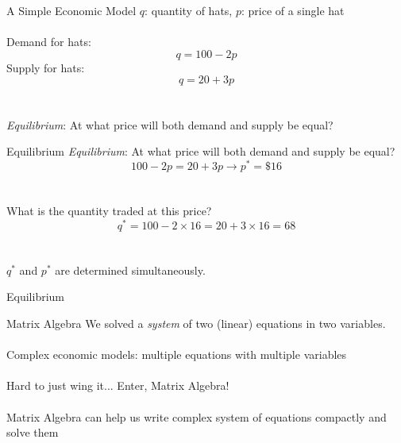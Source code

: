 \documentclass{./../../Latex/teaching_slides}
\begin{document}
\begin{frame}{A Simple Economic Model}
$ q $: quantity of hats, $p$: price of a single hat \\~\\
Demand for hats:
$$ q = 100-2p $$
Supply for hats:
$$ q = 20+3p $$ \\~\\
\textit{Equilibrium}: At what price will both demand and supply be equal? 
\end{frame}

\begin{frame}{Equilibrium}
\textit{Equilibrium}: At what price will both demand and supply be equal? 
$$ 100-2p = 20+3p \rightarrow  p^* = \$16  $$ \\~\\
\pause
What is the quantity traded at this price? 
$$ q ^* = 100-2 \times 16 = 20+3 \times 16 = 68  $$ \\~\\
$q ^*$ and $p^*$ are determined simultaneously. 
\end{frame}

\begin{frame}{Equilibrium}
\begin{center}
\end{center}
\end{frame}


\begin{frame}{Matrix Algebra}
We solved a \textit{system} of two (linear) equations in two variables. \\~\\
Complex economic models: multiple equations with multiple variables \\~\\
Hard to just wing it... Enter, Matrix Algebra! \\~\\
Matrix Algebra can help us write complex system of equations compactly and solve them
\end{frame}
\end{document}
